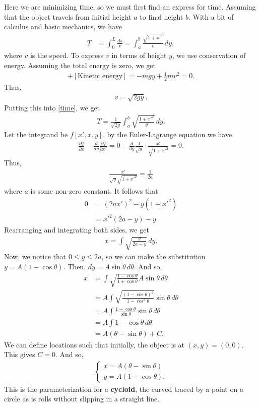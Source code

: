 \documentclass{article}
\newcommand{\p}{\partial}
\newcommand{\f}[2]{\frac{#1}{#2}}
\begin{document}
Here we are minimizing time, so we must first find an express for time. Assuming that the object travels from initial height $a$ to final height $b$. With a bit of calculus and basic mechanics, we have
\begin{align}\label{time}
T &= \int_{0}^{L} \frac{ds}{v} = \int_a^b \f{\sqrt{1 + x'^2}}{v}\,dy,
\end{align}
where $v$ is the speed. To express $v$ in terms of height $y$, we use conservation of energy. Assuming the total energy is zero, we get
\begin{align}
[\text{Potential Energy}] + [\text{Kinetic energy}] = -mgy + \frac{1}{2}mv^2 = 0.
\end{align}
Thus,
\begin{align}
v = \sqrt{2gy}.
\end{align}
Putting this into \eqref{time}, we get
\begin{align}
T = \frac{1}{\sqrt{2g}}\int^b_a \sqrt{\f{1 + x'^2}{y}}\,dy.
\end{align}
Let the integrand be $f[x',x,y]$, by the Euler-Lagrange equation we have
\begin{align}
\frac{\p f}{\p x} - \f{d}{dy}\f{\p f}{\p x'} = 0 - \frac{d}{dy}\f{1}{\sqrt{y}}\cdot \f{x'}{\sqrt{1 + x'^2}}  = 0.
\end{align}
Thus,
\begin{align}
\f{x'}{\sqrt{y}\sqrt{1+x'^2}} = \f{1}{2a}
\end{align}
where $a$ is some non-zero constant. It follows that 
\begin{align}
0 &= (2ax')^2 - y(1+x'^2)\nonumber\\
&= x'^2(2a-y) - y.
\end{align}
Rearranging and integrating both sides, we get
\begin{align}
x = \int \sqrt{\frac{y}{2a-y}}\,dy.
\end{align}
Now, we notice that $0 \leq y \leq 2a$, so we can make the substitution $y = A(1-\cos\theta)$. Then, $dy = A\sin\theta\,d\theta$. And so,
\begin{align}
x 
&= \int \sqrt{\frac{1-\cos\theta}{1 + \cos\theta}}A\sin\theta\,d\theta \nonumber\\
&= A\int \sqrt{\frac{(1 - \cos\theta)^2}{1 - \cos^2\theta}}\sin\theta\,d\theta \nonumber\\
&= A\int \f{1-\cos\theta}{\sin\theta}\sin\theta\,d\theta\nonumber\\
&= A\int 1-\cos\theta \,d\theta\nonumber\\
&= A(\theta - \sin\theta) + C.
\end{align}
We can define locations such that initially, the object is at $(x,y) = (0,0)$. This gives $C = 0$. And so,
\begin{align}
\begin{cases}
x = A(\theta - \sin\theta)\\
y = A(1-\cos\theta).
\end{cases}
\end{align}
This is the parameterization for a \textbf{cycloid}, the curved traced by a point on a circle as is rolls without slipping in a straight line. 
\end{document}
